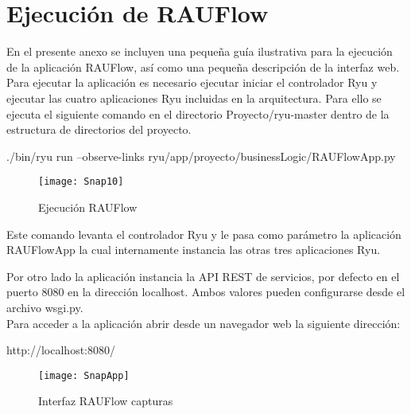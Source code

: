 
\chapter{Ejecuci\'on de RAUFlow}
\label{appendix5}

\ifpdf
    \graphicspath{{Appendix5/Figs/Raster/}{Appendix5/Figs/PDF/}{Appendix5/Figs/}}
\else
    \graphicspath{{Appendix5/Figs/Vector/}{Appendix5/Figs/}}
\fi

En el presente anexo se incluyen una peque\~na guía ilustrativa para la ejecuci\'on de la aplicaci\'on RAUFlow, así como una pequeña descripción de la interfaz web.\\

Para ejecutar la aplicaci\'on es necesario ejecutar iniciar el controlador Ryu y ejecutar las cuatro aplicaciones Ryu incluidas en la arquitectura. Para ello se ejecuta el siguiente comando en el directorio Proyecto/ryu-master dentro de la estructura de directorios del proyecto.

\begin{center}
./bin/ryu run --observe-links ryu/app/proyecto/businessLogic/RAUFlowApp.py

\end{center}

\begin{figure}[h] 
\centering    
\texttt{[image: Snap10]}
\caption[Ejecuci\'on RAUFlow]{Ejecuci\'on RAUFlow}
\label{fig:Img2}
\end{figure}

Este comando levanta el controlador Ryu y le pasa como parámetro la aplicaci\'on RAUFlowApp la cual internamente instancia las otras tres aplicaciones Ryu.

Por otro lado la aplicaci\'on instancia la API REST de servicios, por defecto en el puerto 8080 en la direcci\'on localhost. Ambos valores pueden configurarse desde el archivo wsgi.py.\\

Para acceder a la aplicaci\'on abrir desde un navegador web la siguiente direcci\'on:

\begin{center}
http://localhost:8080/
\end{center}


\begin{figure}[ht!] 
\centering    
\texttt{[image: SnapApp]}
\caption[Interfaz RAUFlow capturas]{Interfaz RAUFlow capturas}
\label{fig:Img2}
\end{figure}